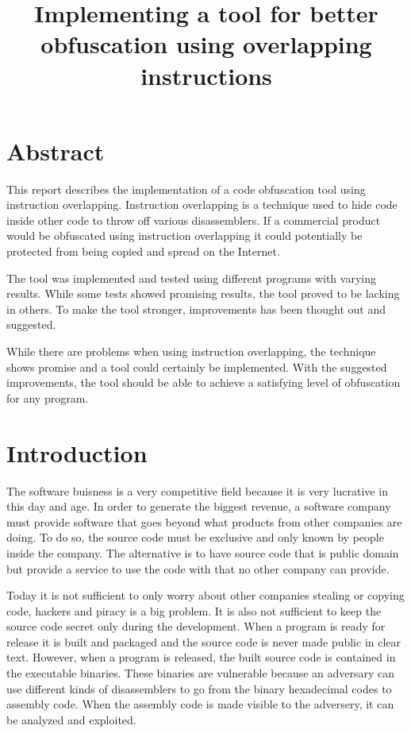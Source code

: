 \documentclass[11pt,twoside]{eitExjobb}
\title{Implementing a tool for better obfuscation using overlapping instructions}
\begin{document}
\Date{\today}
\MakeTitlePage
\frontmatter
\chapter*{Abstract}
This report describes the implementation of a code obfuscation tool using instruction overlapping. Instruction overlapping is a technique used to hide code inside other code to throw off various disassemblers. If a commercial product would be obfuscated using instruction overlapping it could potentially be protected from being copied and spread on the Internet.

The tool was implemented and tested using different programs with varying results. While some tests showed promising results, the tool proved to be lacking in others. To make the tool stronger, improvements has been thought out and suggested.

While there are problems when using instruction overlapping, the technique shows promise and a tool could certainly be implemented. With the suggested improvements, the tool should be able to achieve a satisfying level of obfuscation for any program. 

\tableofcontents
\listoftables
\cleardoublepage
\mainmatter

\chapter{Introduction}
The software buisness is a very competitive field because it is very lucrative in this day and age. In order to generate the biggest revenue, a software company must provide software that goes beyond what products from other companies are doing. To do so, the source code must be exclusive and only known by people inside the company. The alternative is to have source code that is public domain but provide a service to use the code with that no other company can provide. 

Today it is not sufficient to only worry about other companies stealing or copying code, hackers and piracy is a big problem. It is also not sufficient to keep the source code secret only during the development. When a program is ready for release it is built and packaged and the source code is never made public in clear text. However, when a program is released, the built source code is contained in the executable binaries. These binaries are vulnerable because an adversary can use different kinds of disassemblers to go from the binary hexadecimal codes to assembly code. When the assembly code is made visible to the adversery, it can be analyzed and exploited. 
\end{document}

